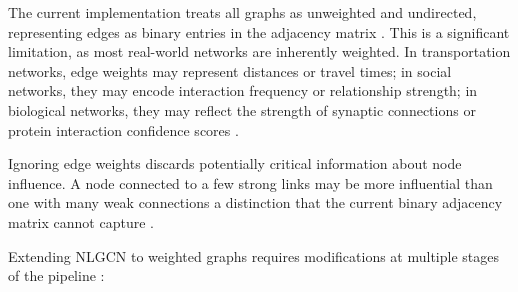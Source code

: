The current implementation treats all graphs as unweighted and
undirected, representing edges as binary entries in the adjacency
matrix \cite{guo2026}. This is a significant limitation, as most
real-world networks are inherently weighted. In transportation
networks, edge weights may represent distances or travel times;
in social networks, they may encode interaction frequency or
relationship strength; in biological networks, they may reflect
the strength of synaptic connections or protein interaction
confidence scores \cite{hafiene2020, thotakura2024}.

Ignoring edge weights discards potentially critical information
about node influence. A node connected to a few strong links
may be more influential than one with many weak connections a distinction that the current binary adjacency matrix
cannot capture \cite{mukhtar, chen2012}.

Extending NLGCN to weighted graphs requires modifications at
multiple stages of the pipeline \cite{guo2026, patel2025}:

